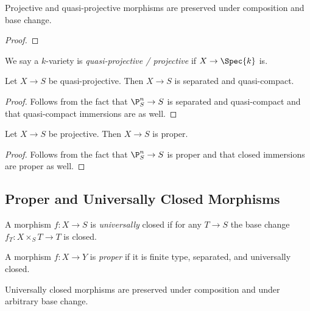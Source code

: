\documentclass[12pt]{article}
\begin{document}
\begin{lemma}
Projective and quasi-projective morphisms are preserved under composition and base change.
\end{lemma}

\begin{proof}

\end{proof}

\begin{defn}
We say a $k$-variety is \textit{quasi-projective / projective} if $X \to \Spec{k}$ is.
\end{defn}

\begin{prop}
Let $X \to S$ be quasi-projective. Then $X \to S$ is separated and quasi-compact.
\end{prop}

\begin{proof}
Follows from the fact that $\P^n_S \to S$ is separated and quasi-compact and that quasi-compact immersions are as well.
\end{proof}

\begin{prop}
Let $X \to S$ be projective. Then $X \to S$ is proper.
\end{prop}

\begin{proof}
Follows from the fact that $\P^n_S \to S$ is proper and that closed immersions are proper as well.
\end{proof}

\subsection{Proper and Universally Closed Morphisms}

\begin{defn}
A morphism $f : X \to S$ is \textit{universally} closed if for any $T \to S$ the base change $f_T : X \times_S T \to T$ is closed. 
\end{defn}

\begin{defn}
A morphism $f : X \to Y$ is \textit{proper} if it is finite type, separated, and universally closed. 
\end{defn}

\begin{lemma}
Universally closed morphisms are preserved under composition and under arbitrary base change.
\end{lemma}
\end{document}
